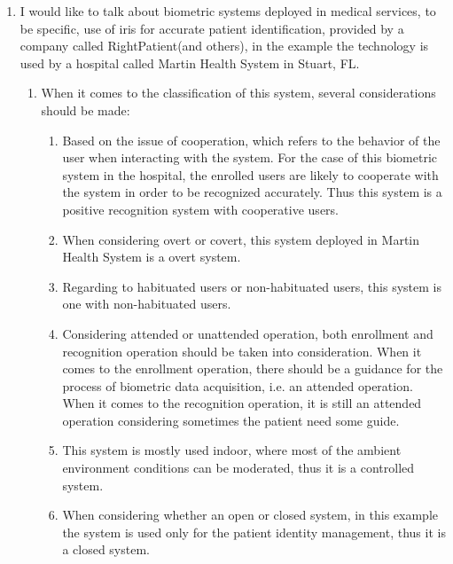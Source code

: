 \documentclass[a4paper]{article}
\begin{document}
\begin{spacing}{2.0}
\begin{enumerate}
\newpage
\item I would like to talk about biometric systems deployed in medical services, to be specific, use of iris for accurate patient identification, provided by a company called RightPatient(and others), in the example the technology is used by a hospital called Martin Health System in Stuart, FL.
\begin{enumerate}
\item When it comes to the classification of this system, several considerations should be made:
\begin{enumerate}
\item Based on the issue of cooperation, which refers to the behavior of the user when interacting with the system. For the case of this biometric system in the hospital, the enrolled users are likely to cooperate with the system in order to be recognized accurately. Thus this system is a positive recognition system with cooperative users.
\item When considering overt or covert, this system deployed in Martin Health System is a overt system.
\item Regarding to habituated users or non-habituated users, this system is one with non-habituated users.
\item Considering attended or unattended operation, both enrollment and recognition operation should be taken into consideration. When it comes to the enrollment operation, there should be a guidance for the process of biometric data acquisition, i.e. an attended operation. When it comes to the recognition operation, it is still an attended operation considering sometimes the patient need some guide.
\item This system is mostly used indoor, where most of the ambient environment conditions can be moderated, thus it is a controlled system.
\item When considering whether an open or closed system, in this example the system is used only for the patient identity management, thus it is a closed system.


\end{enumerate}
\end{enumerate}
\end{enumerate}
\end{spacing}
\end{document}
